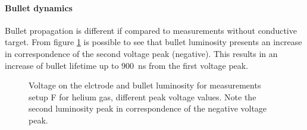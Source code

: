 \paragraph{Bullet dynamics}
Bullet propagation is different if compared to measurements without conductive target. From figure \ref{fig:elio_a_Im} is possible to see that bullet luminosity presents an increase in correspondence of the second voltage peak (negative). This results in an increase of bullet lifetime up to \SI{900}{\nano\second} from the first voltage peak.
\begin{figure}
 \centering
 \hfill
 \caption{Voltage on the elctrode and bullet luminosity for measurements setup F for helium gas, different peak voltage values. Note the second luminosity peak in correspondence of the negative voltage peak.}
 \label{fig:elio_a_Im}
\end{figure}

